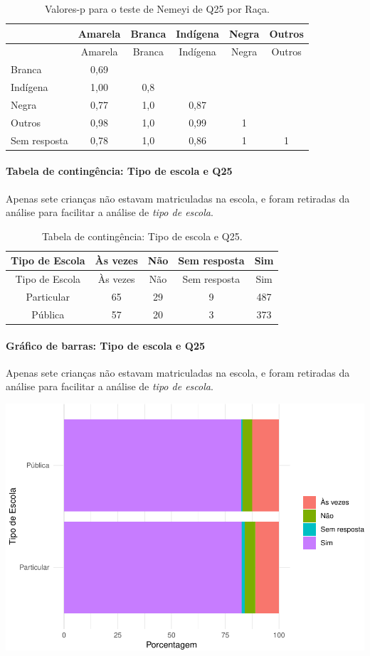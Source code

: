 \documentclass[]{article}
\let\oldparagraph\paragraph
\renewcommand{\paragraph}[1]{\oldparagraph{#1}\mbox{}}
\begin{document}
\begin{longtable}[]{@{}lccccc@{}}
\caption{\label{tab:unnamed-chunk-700}Valores-p para o teste de Nemeyi de Q25 por Raça.}\tabularnewline
\toprule
& Amarela & Branca & Indígena & Negra & Outros\tabularnewline
\midrule
\endfirsthead
\toprule
& Amarela & Branca & Indígena & Negra & Outros\tabularnewline
\midrule
\endhead
Branca & 0,69 & & & &\tabularnewline
Indígena & 1,00 & 0,8 & & &\tabularnewline
Negra & 0,77 & 1,0 & 0,87 & &\tabularnewline
Outros & 0,98 & 1,0 & 0,99 & 1 &\tabularnewline
Sem resposta & 0,78 & 1,0 & 0,86 & 1 & 1\tabularnewline
\bottomrule
\end{longtable}

\cleardoublepage

\hypertarget{tabela-de-continguxeancia-tipo-de-escola-e-q25}{%
\paragraph{Tabela de contingência: Tipo de escola e Q25}\label{tabela-de-continguxeancia-tipo-de-escola-e-q25}}

Apenas sete crianças não estavam matriculadas na escola, e foram retiradas da análise para facilitar a análise de \emph{tipo de escola}.

\begin{longtable}[]{@{}ccccc@{}}
\caption{\label{tab:unnamed-chunk-701}Tabela de contingência: Tipo de escola e Q25.}\tabularnewline
\toprule
Tipo de Escola & Às vezes & Não & Sem resposta & Sim\tabularnewline
\midrule
\endfirsthead
\toprule
Tipo de Escola & Às vezes & Não & Sem resposta & Sim\tabularnewline
\midrule
\endhead
Particular & 65 & 29 & 9 & 487\tabularnewline
Pública & 57 & 20 & 3 & 373\tabularnewline
\bottomrule
\end{longtable}

\hypertarget{gruxe1fico-de-barras-tipo-de-escola-e-q25}{%
\paragraph{Gráfico de barras: Tipo de escola e Q25}\label{gruxe1fico-de-barras-tipo-de-escola-e-q25}}

Apenas sete crianças não estavam matriculadas na escola, e foram retiradas da análise para facilitar a análise de \emph{tipo de escola}.

\begin{center}\includegraphics[width=0.75\linewidth]{relatorio_covid19_files/figure-latex/unnamed-chunk-702-1} \end{center}
\end{document}
